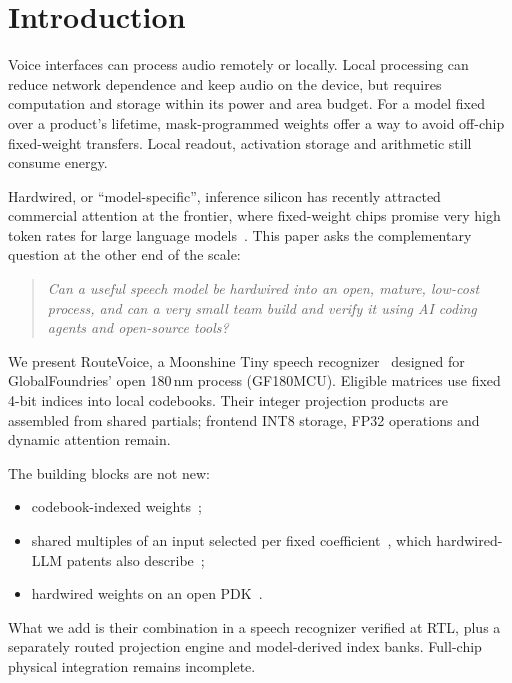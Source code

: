 \section{Introduction}
\label{sec:intro}

Voice interfaces can process audio remotely or locally. Local processing can reduce network dependence and keep audio on the device, but requires computation and storage within its power and area budget. For a model fixed over a product's lifetime, mask-programmed weights offer a way to avoid off-chip fixed-weight transfers. Local readout, activation storage and arithmetic still consume energy.

Hardwired, or ``model-specific'', inference silicon has recently attracted commercial attention at the frontier, where fixed-weight chips promise very high token rates for large language models~\cite{taalas2026hc1}. This paper asks the complementary question at the other end of the scale:
\begin{quote}
\emph{Can a useful speech model be hardwired into an open, mature, low-cost process, and can a very small team build and verify it using AI coding agents and open-source tools?}
\end{quote}

We present RouteVoice, a Moonshine Tiny speech recognizer~\cite{jeffries2024moonshine} designed for GlobalFoundries' open 180\,nm process (GF180MCU). Eligible matrices use fixed 4-bit indices into local codebooks. Their integer projection products are assembled from shared partials; frontend INT8 storage, FP32 operations and dynamic attention remain.

The building blocks are not new:
\begin{itemize}
\item codebook-indexed weights~\cite{han2016eie,zadeh2022mokey};
\item shared multiples of an input selected per fixed coefficient~\cite{park2002cshm}, which hardwired-LLM patents also describe~\cite{taalas2025patent802,taalas2026patent566};
\item hardwired weights on an open PDK~\cite{pai2026ankhdjet}.
\end{itemize}
What we add is their combination in a speech recognizer verified at RTL, plus a separately routed projection engine and model-derived index banks. Full-chip physical integration remains incomplete.

